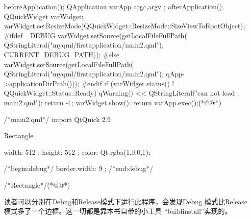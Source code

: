 \FloatBarrier
\begin{thebookfilesourceone}[escapeinside={(*@}{@*)},
label=f000021,
caption=GoodLuck,
title=\lstlistingname \thelstlisting
,firstnumber=90]
beforeApplication();
QApplication varApp{ argc,argv };
afterApplication();
QQuickWidget varWidget;
varWidget.setResizeMode(QQuickWidget::ResizeMode::SizeViewToRootObject);
#ifdef _DEBUG
varWidget.setSource(getLocalFileFullPath(
    QStringLiteral("myqml/firstapplication/main2.qml"),
    CURRENT_DEBUG_PATH));
#else
varWidget.setSource(getLocalFileFullPath(
    QStringLiteral("myqml/firstapplication/main2.qml"),
    qApp->applicationDirPath()));
#endif
if (varWidget.status() != QQuickWidget::Status::Ready) {
    qWarning() << QStringLiteral("can not load : main2.qml");
    return -1;
}
varWidget.show();
return varApp.exec();(*@\marginpar[\hfill\setlength\fboxsep{2pt}\fbox{\footnotesize{\kaishu\parbox{1em}{\setlength{\baselineskip}{2pt}\lstlistingname}}\footnotesize{\thelstlisting}}]{\setlength\fboxsep{2pt}\fbox{\footnotesize{\kaishu\parbox{1em}{\setlength{\baselineskip}{2pt}\lstlistingname}}\footnotesize{\thelstlisting}}}@*)\end{thebookfilesourceone}          %
\FloatBarrier
\begin{thebookfilesourceone}[escapeinside={(*@}{@*)},
label=f000024,
caption=GoodLuck,
title=\lstlistingname \thelstlisting
]
/*main2.qml*/
import QtQuick 2.9

Rectangle{

    width: 512 ;
    height: 512 ;
    color: Qt.rgba(1,0,0,1);

/*begin:debug*/
    border.width: 9 ;
/*end:debug*/


}/*Rectangle*/(*@\marginpar[\hfill\setlength\fboxsep{2pt}\fbox{\footnotesize{\kaishu\parbox{1em}{\setlength{\baselineskip}{2pt}\lstlistingname}}\footnotesize{\thelstlisting}}]{\setlength\fboxsep{2pt}\fbox{\footnotesize{\kaishu\parbox{1em}{\setlength{\baselineskip}{2pt}\lstlistingname}}\footnotesize{\thelstlisting}}}@*)\end{thebookfilesourceone}          %

读者可以分别在Debug和Release模式下运行此程序，会发现Debug
模式比Release模式多了一个边框。这一切都是靠本书自带的小工具
“build\underline{\hspace{0.5em}}install”实现的。

